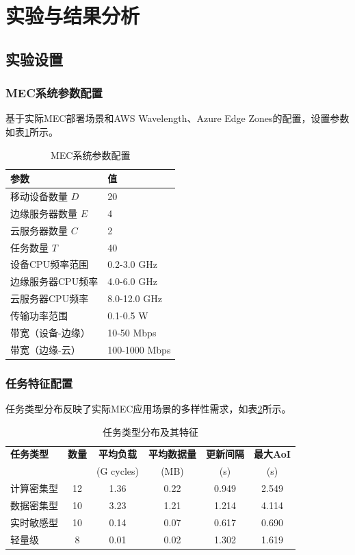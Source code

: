\documentclass[conference]{IEEEtran}
\begin{document}
\section{实验与结果分析}
\subsection{实验设置}
\subsubsection{MEC系统参数配置}
基于实际MEC部署场景和AWS Wavelength、Azure Edge Zones的配置，设置参数如表\ref{tab:system}所示。

\begin{table}[H]
\centering
\caption{MEC系统参数配置}
\label{tab:system}
\begin{tabular}{|l|l|}
\hline
\textbf{参数} & \textbf{值} \\
\hline
移动设备数量 $D$ & 20 \\
边缘服务器数量 $E$ & 4 \\
云服务器数量 $C$ & 2 \\
任务数量 $T$ & 40 \\
设备CPU频率范围 & 0.2-3.0 GHz \\
边缘服务器CPU频率 & 4.0-6.0 GHz \\
云服务器CPU频率 & 8.0-12.0 GHz \\
传输功率范围 & 0.1-0.5 W \\
带宽（设备-边缘） & 10-50 Mbps \\
带宽（边缘-云） & 100-1000 Mbps \\
\hline
\end{tabular}
\end{table}

\subsubsection{任务特征配置}
任务类型分布反映了实际MEC应用场景的多样性需求，如表\ref{tab:task}所示。

\begin{table}[H]
\centering
\caption{任务类型分布及其特征}
\label{tab:task}
\begin{tabular}{|l|c|c|c|c|c|}
\hline
\textbf{任务类型} & \textbf{数量} & \textbf{平均负载} & \textbf{平均数据量} & \textbf{更新间隔} & \textbf{最大AoI} \\
& & (G cycles) & (MB) & (s) & (s) \\
\hline
计算密集型 & 12 & 1.36 & 0.22 & 0.949 & 2.549 \\
数据密集型 & 10 & 3.23 & 1.21 & 1.214 & 4.114 \\
实时敏感型 & 10 & 0.14 & 0.07 & 0.617 & 0.690 \\
轻量级 & 8 & 0.01 & 0.02 & 1.302 & 1.619 \\
\hline
\end{tabular}
\end{table}
\end{document}
